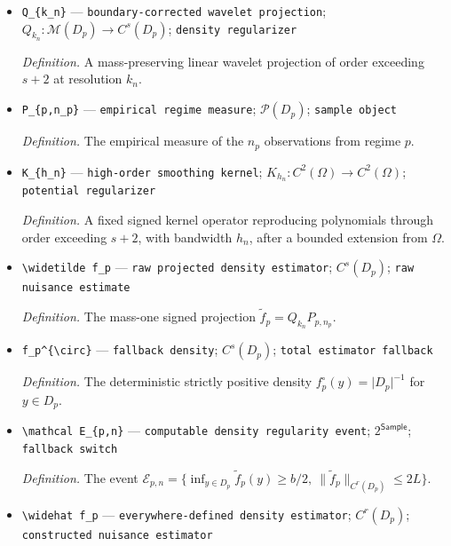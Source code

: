 \documentclass{article}
\begin{document}
\begin{itemize}
  \item \texttt{Q\_\allowbreak{}\{k\_\allowbreak{}n\}\allowbreak{}} --- \texttt{boundary-\allowbreak{}corrected wavelet projection}; \(Q_{k_n}:\mathcal M(D_p)\to C^s(D_p)\); \texttt{density regularizer}
  \par\smallskip\noindent\emph{Definition.} A mass-preserving linear wavelet projection of order exceeding \(s+2\) at resolution \(k_n\).
  \item \texttt{P\_\allowbreak{}\{p,\allowbreak{}n\_\allowbreak{}p\}\allowbreak{}} --- \texttt{empirical regime measure}; \(\mathcal P(D_p)\); \texttt{sample object}
  \par\smallskip\noindent\emph{Definition.} The empirical measure of the \(n_p\) observations from regime \(p\).
  \item \texttt{K\_\allowbreak{}\{h\_\allowbreak{}n\}\allowbreak{}} --- \texttt{high-\allowbreak{}order smoothing kernel}; \(K_{h_n}:C^2(\Omega)\to C^2(\Omega)\); \texttt{potential regularizer}
  \par\smallskip\noindent\emph{Definition.} A fixed signed kernel operator reproducing polynomials through order exceeding \(s+2\), with bandwidth \(h_n\), after a bounded extension from \(\Omega\).
  \item \texttt{\textbackslash{}\allowbreak{}widetilde f\_\allowbreak{}p} --- \texttt{raw projected density estimator}; \(C^s(D_p)\); \texttt{raw nuisance estimate}
  \par\smallskip\noindent\emph{Definition.} The mass-one signed projection \(\widetilde f_p=Q_{k_n}P_{p,n_p}\).
  \item \texttt{f\_\allowbreak{}p\textasciicircum{}\{\textbackslash{}\allowbreak{}circ\}\allowbreak{}} --- \texttt{fallback density}; \(C^s(D_p)\); \texttt{total estimator fallback}
  \par\smallskip\noindent\emph{Definition.} The deterministic strictly positive density \(f_p^{\circ}(y)=\lvert D_p\rvert^{-1}\) for \(y\in D_p\).
  \item \texttt{\textbackslash{}\allowbreak{}mathcal E\_\allowbreak{}\{p,\allowbreak{}n\}\allowbreak{}} --- \texttt{computable density regularity event}; \(2^{\mathsf{Sample}}\); \texttt{fallback switch}
  \par\smallskip\noindent\emph{Definition.} The event \(\mathcal E_{p,n}=\{\inf_{y\in D_p}\widetilde f_p(y)\ge b/2,\ \lVert\widetilde f_p\rVert_{C^r(D_p)}\le2L\}\).
  \item \texttt{\textbackslash{}\allowbreak{}widehat f\_\allowbreak{}p} --- \texttt{everywhere-\allowbreak{}defined density estimator}; \(C^r(D_p)\); \texttt{constructed nuisance estimator}

\end{itemize}
\end{document}
